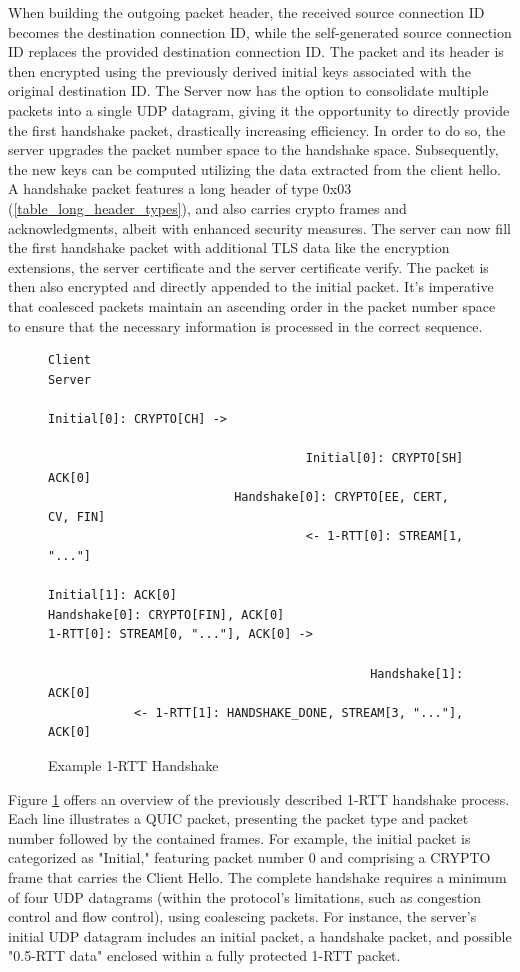 When building the outgoing packet header, the received source connection ID becomes the destination connection ID, while the
self-generated source connection ID replaces the provided destination connection ID. The packet and its header is then encrypted
using the previously derived initial keys associated with the original destination ID. The Server now has the option to consolidate
multiple packets into a single UDP datagram, giving it the opportunity to directly provide the first handshake packet, drastically
increasing efficiency. In order to do so, the server upgrades the packet number space to the handshake space. Subsequently,
the new keys can be computed utilizing the data extracted from the client hello. A handshake packet features a long header of
type 0x03 (\ref{table_long_header_types}), and also carries crypto frames and acknowledgments, albeit with enhanced security
measures. The server can now fill the first handshake packet with additional TLS data like the encryption extensions, the server
certificate and the server certificate verify. The packet is then also encrypted and directly appended to the initial packet. It's
imperative that coalesced packets maintain an ascending order in the packet number space to ensure that the necessary information
is processed in the correct sequence.

\begin{figure}[htb]
    \centering      
\begin{verbatim}
Client                                                     Server

Initial[0]: CRYPTO[CH] ->

                                    Initial[0]: CRYPTO[SH] ACK[0]
                          Handshake[0]: CRYPTO[EE, CERT, CV, FIN]
                                    <- 1-RTT[0]: STREAM[1, "..."]

Initial[1]: ACK[0]
Handshake[0]: CRYPTO[FIN], ACK[0]
1-RTT[0]: STREAM[0, "..."], ACK[0] ->

                                             Handshake[1]: ACK[0]
            <- 1-RTT[1]: HANDSHAKE_DONE, STREAM[3, "..."], ACK[0]
\end{verbatim}
    \caption{Example 1-RTT Handshake\cite[35]{rfc9000}}
    \label{example_handshake}
\end{figure}

Figure \ref{example_handshake} offers an overview of the previously described 1-RTT handshake process. Each line illustrates a
QUIC packet, presenting the packet type and packet number followed by the contained frames. For example,
the initial packet is categorized as "Initial," featuring packet number 0 and comprising a CRYPTO frame that carries the Client Hello.
The complete handshake requires a minimum of four UDP datagrams (within the protocol's limitations, such as congestion
control and flow control), using coalescing packets. For instance, the server's initial UDP datagram includes an initial packet,
a handshake packet, and possible "0.5-RTT data" enclosed within a fully protected 1-RTT packet.


